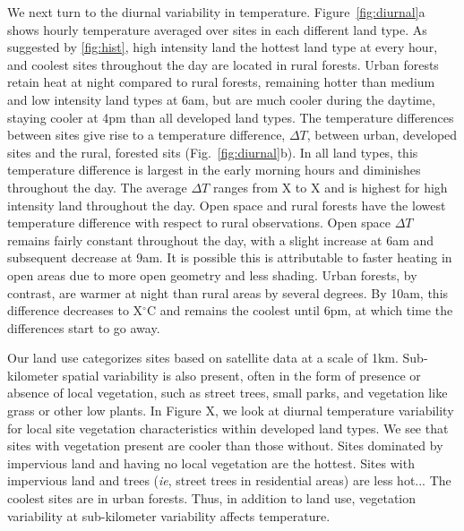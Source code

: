 \documentclass[draft,linenumbers]{agujournal}
\begin{document}
We next turn to the diurnal variability in temperature. Figure~\ref{fig:diurnal}a shows hourly temperature averaged over sites in each different land type. As suggested by \ref{fig:hist}, high intensity land the hottest land type at every hour, and coolest sites throughout the day are located in rural forests. Urban forests retain heat at night compared to rural forests, remaining hotter than medium and low intensity land types at 6am, but are much cooler during the daytime, staying cooler at 4pm than all developed land types. 
The temperature differences between sites give rise to a temperature difference, $\Delta T$, between urban, developed sites and the rural, forested sits (Fig.~\ref{fig:diurnal}b). In all land types, this temperature difference is largest in the early morning hours and diminishes throughout the day. The average $\Delta T$ ranges from X to X
and is highest for high intensity land throughout the day. Open space and rural forests have the lowest temperature difference with respect to rural observations. Open space $\Delta T$ remains fairly constant throughout the day, with a slight increase at 6am and subsequent decrease at 9am. It is possible this is attributable to faster heating in open areas due to more open geometry and less shading. Urban forests, by contrast, are warmer at night than rural areas by several degrees. By 10am, this difference decreases to X$^\circ$C 
and remains the coolest until 6pm, at which time the differences start to go away. 

Our land use categorizes sites based on satellite data at a scale of 1km. Sub-kilometer spatial variability is also present, often in the form of presence or absence of local vegetation, such as street trees, small parks, and vegetation like grass or other low plants. In Figure X, we look at diurnal temperature variability for local site vegetation characteristics within developed land types. We see that sites with vegetation present are cooler than those without. Sites dominated by impervious land and having no local vegetation are the hottest. Sites with impervious land and trees (\textit{ie}, street trees in residential areas) are less hot... The coolest sites are in urban forests. Thus, in addition to land use, vegetation variability at sub-kilometer variability affects temperature. 
\end{document}
